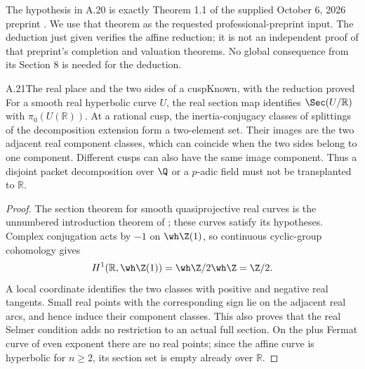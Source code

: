 
The hypothesis in A.20 is exactly Theorem 1.1 of the supplied October 6, 2026 preprint \citep{OpenAILocal2026}. We use that theorem as the requested professional-preprint input. The deduction just given verifies the affine reduction; it is not an independent proof of that preprint's completion and valuation theorems. No global consequence from its Section 8 is needed for the deduction.

\begin{statement}{A.21}{The real place and the two sides of a cusp}{Known, with the reduction proved}
For a smooth real hyperbolic curve $U$, the real section map identifies $\Sec(U/\mathbb R)$ with $\pi_0(U(\mathbb R))$. At a rational cusp, the inertia-conjugacy classes of splittings of the decomposition extension form a two-element set. Their images are the two adjacent real component classes, which can coincide when the two sides belong to one component. Different cusps can also have the same image component. Thus a disjoint packet decomposition over $\Q$ or a $p$-adic field must not be transplanted to $\mathbb R$.
\end{statement}
\begin{proof}
The section theorem for smooth quasiprojective real curves is the unnumbered introduction theorem of \citet{BrescianiVistoli2020}; these curves satisfy its hypotheses. Complex conjugation acts by $-1$ on $\wh\Z(1)$, so continuous cyclic-group cohomology gives
\[
H^1(\mathbb R,\wh\Z(1))=\wh\Z/2\wh\Z=\Z/2.
\]
A local coordinate identifies the two classes with positive and negative real tangents. Small real points with the corresponding sign lie on the adjacent real arcs, and hence induce their component classes. This also proves that the real Selmer condition adds no restriction to an actual full section. On the plus Fermat curve of even exponent there are no real points; since the affine curve is hyperbolic for $n\ge2$, its section set is empty already over $\mathbb R$.
\end{proof}

